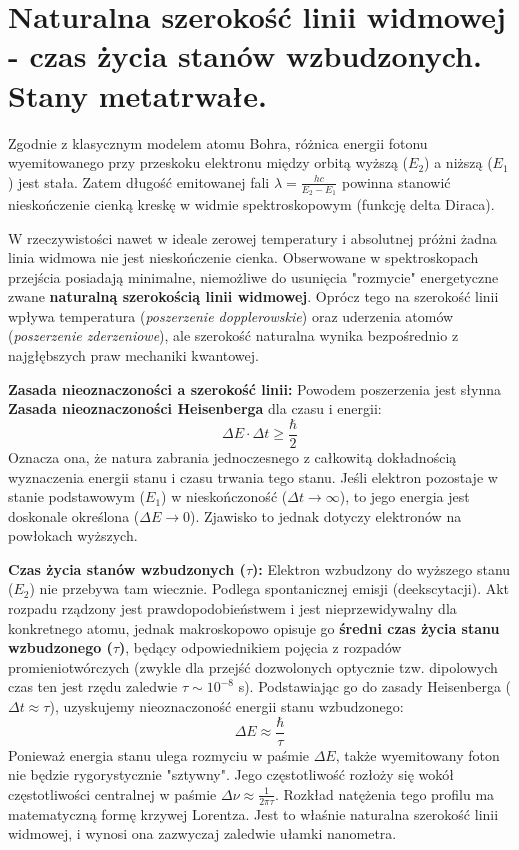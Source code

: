 \documentclass[11pt, a4paper]{article}
\begin{document}
\section{Naturalna szerokość linii widmowej - czas życia stanów wzbudzonych. Stany metatrwałe.}

Zgodnie z klasycznym modelem atomu Bohra, różnica energii fotonu wyemitowanego przy przeskoku elektronu między orbitą wyższą ($E_2$) a niższą ($E_1$) jest stała. Zatem długość emitowanej fali $\lambda = \frac{hc}{E_2 - E_1}$ powinna stanowić nieskończenie cienką kreskę w widmie spektroskopowym (funkcję delta Diraca). 

W rzeczywistości nawet w ideale zerowej temperatury i absolutnej próżni żadna linia widmowa nie jest nieskończenie cienka. Obserwowane w spektroskopach przejścia posiadają minimalne, niemożliwe do usunięcia "rozmycie" energetyczne zwane \textbf{naturalną szerokością linii widmowej}. Oprócz tego na szerokość linii wpływa temperatura (\textit{poszerzenie dopplerowskie}) oraz uderzenia atomów (\textit{poszerzenie zderzeniowe}), ale szerokość naturalna wynika bezpośrednio z najgłębszych praw mechaniki kwantowej.

\textbf{Zasada nieoznaczoności a szerokość linii:}
Powodem poszerzenia jest słynna \textbf{Zasada nieoznaczoności Heisenberga} dla czasu i energii:
\[
\Delta E \cdot \Delta t \ge \frac{\hbar}{2}
\]
Oznacza ona, że natura zabrania jednoczesnego z całkowitą dokładnością wyznaczenia energii stanu i czasu trwania tego stanu. Jeśli elektron pozostaje w stanie podstawowym ($E_1$) w nieskończoność ($\Delta t \to \infty$), to jego energia jest doskonale określona ($\Delta E \to 0$). Zjawisko to jednak dotyczy elektronów na powłokach wyższych.

\textbf{Czas życia stanów wzbudzonych ($\tau$):}
Elektron wzbudzony do wyższego stanu ($E_2$) nie przebywa tam wiecznie. Podlega spontanicznej emisji (deekscytacji). Akt rozpadu rządzony jest prawdopodobieństwem i jest nieprzewidywalny dla konkretnego atomu, jednak makroskopowo opisuje go \textbf{średni czas życia stanu wzbudzonego ($\tau$)}, będący odpowiednikiem pojęcia z rozpadów promieniotwórczych (zwykle dla przejść dozwolonych optycznie tzw. dipolowych czas ten jest rzędu zaledwie $\tau \sim 10^{-8}$ s).
Podstawiając go do zasady Heisenberga ($\Delta t \approx \tau$), uzyskujemy nieoznaczoność energii stanu wzbudzonego:
\[
\Delta E \approx \frac{\hbar}{\tau}
\]
Ponieważ energia stanu ulega rozmyciu w paśmie $\Delta E$, także wyemitowany foton nie będzie rygorystycznie "sztywny". Jego częstotliwość rozłoży się wokół częstotliwości centralnej w paśmie $\Delta \nu \approx \frac{1}{2\pi\tau}$. Rozkład natężenia tego profilu ma matematyczną formę krzywej Lorentza. Jest to właśnie naturalna szerokość linii widmowej, i wynosi ona zazwyczaj zaledwie ułamki nanometra.
\end{document}
